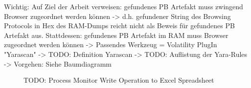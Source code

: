 Wichtig: Auf Ziel der Arbeit verweisen: gefundenes PB Artefakt muss zwingend Browser zugeordnet werden können -> d.h. gefundener String des Browsing Protocols in Hex des RAM-Dumps reicht nicht als Beweis für gefundenes PB Artefakt aus.
Stattdessen: gefundenes PB Artefakt im RAM muss Browser zugeordnet werden können -> Passendes Werkzeug = Volatility PlugIn "Yarascan" 
-> TODO: Definition Yarascan
-> TODO: Auflistung der Yara-Rules
-> Vorgehen: Siehe Baumdiagramm
\begin{figure}[h!]
	\centering
	\small
	\centerline{\resizebox{\linewidth}{!}{}}
	\caption{TODO: Process Monitor Write Operation to Excel Spreadsheet}
	\label{fig:jes}
\end{figure}





